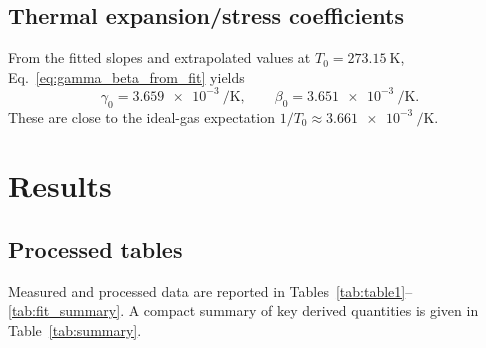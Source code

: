 \documentclass[journal]{IEEEtran}
\begin{document}
\subsection{Thermal expansion/stress coefficients}
From the fitted slopes and extrapolated values at $T_0=\SI{273.15}{\kelvin}$, Eq.~\eqref{eq:gamma_beta_from_fit} yields
\begin{equation}
	\gamma_0 = \SI{3.659e-3}{\per\kelvin},\qquad \beta_0 = \SI{3.651e-3}{\per\kelvin}.
	\label{eq:gamma_beta_values}
\end{equation}
These are close to the ideal-gas expectation $1/T_0 \approx \SI{3.661e-3}{\per\kelvin}$.

\section{Results}

\subsection{Processed tables}
Measured and processed data are reported in Tables~\ref{tab:table1}--\ref{tab:fit_summary}. A compact summary of key derived quantities is given in Table~\ref{tab:summary}.

\begin{table}[H]
	\centering
	\caption{Summary of derived quantities.}
	\label{tab:summary}
\end{table}

\begin{table}[H]
	\centering
	\caption{Part I (isothermal): processed data and calculated $R$ at $T=\SI{303.15}{\kelvin}$.}
	\label{tab:table1}
\end{table}

\begin{table}[H]
	\centering
	\caption{Part II (isobaric): processed temperature and volume data.}
	\label{tab:table2}
\end{table}
\end{document}
